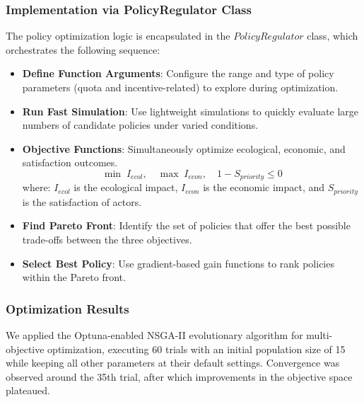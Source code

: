 \documentclass[ruler]{CUP-JNL-EDS}%
\begin{document}
\subsubsection{Implementation via PolicyRegulator Class}
The policy optimization logic is encapsulated in the $PolicyRegulator$ class, which orchestrates the following sequence:
\begin{itemize}
    \item \textbf{Define Function Arguments}: Configure the range and type of policy parameters (quota and incentive-related) to explore during optimization.
    \item \textbf{Run Fast Simulation}: Use lightweight simulations to quickly evaluate large numbers of candidate policies under varied conditions.
    \item \textbf{Objective Functions}: Simultaneously optimize ecological, economic, and satisfaction outcomes.
\[
\min \; I_{ecol}, \quad
\max \; I_{econ}, \quad
1 - S_{priority} \leq 0
\]
where: $I_{ecol}$ is the ecological impact, $I_{econ}$ is the economic impact, and $S_{priority}$ is the satisfaction of actors.
    \item \textbf{Find Pareto Front}: Identify the set of policies that offer the best possible trade-offs between the three objectives.
    \item \textbf{Select Best Policy}: Use gradient-based gain functions to rank policies within the Pareto front.
\end{itemize}

\subsubsection{Optimization Results}

We applied the Optuna-enabled NSGA-II evolutionary algorithm for multi-objective optimization, executing 60 trials with an initial population size of 15 while keeping all other parameters at their default settings. Convergence was observed around the 35th trial, after which improvements in the objective space plateaued.
\end{document}
